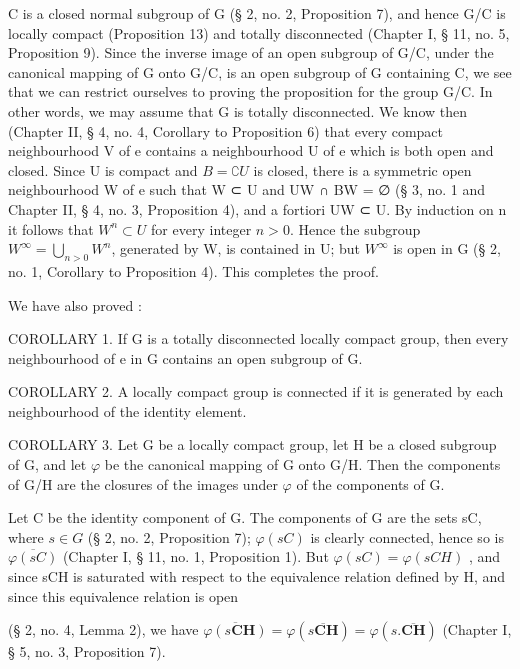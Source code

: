 C is a closed normal subgroup of G (§ 2, no. 2, Proposition 7), and hence G/C is locally compact (Proposition 13) and totally disconnected (Chapter I, § 11, no. 5, Proposition 9). Since the inverse image of an open subgroup of G/C, under the canonical mapping of G onto G/C, is an open subgroup of G containing C, we see that we can restrict ourselves to proving the proposition for the group G/C. In other words, we may assume that G is totally disconnected. We know then (Chapter II, § 4, no. 4, Corollary to Proposition 6) that every compact neighbourhood V of e contains a neighbourhood U of e which is both open and closed. Since U is compact and \(B = \complement U\) is closed, there is a symmetric open neighbourhood W of e such that W ⊂ U and UW ∩ BW = ∅ (§ 3, no. 1 and Chapter II, § 4, no. 3, Proposition 4), and a fortiori UW ⊂ U. By induction on n it follows that \(W^n \subset U\) for every integer \(n > 0\). Hence the subgroup \(W^\infty = \bigcup_{n > 0} W^n\), generated by W, is contained in U; but \(W^\infty\) is open in G (§ 2, no. 1, Corollary to Proposition 4). This completes the proof.

We have also proved :

COROLLARY 1. If G is a totally disconnected locally compact group, then every neighbourhood of e in G contains an open subgroup of G.

COROLLARY 2. A locally compact group is connected if it is generated by each neighbourhood of the identity element.

COROLLARY 3. Let G be a locally compact group, let H be a closed subgroup of G, and let \(\varphi\) be the canonical mapping of G onto G/H. Then the components of G/H are the closures of the images under \(\varphi\) of the components of G.

Let C be the identity component of G. The components of G are the sets sC, where \(s \in G\) (§ 2, no. 2, Proposition 7); \(\varphi(sC)\) is clearly connected, hence so is \(\overline{\varphi(sC)}\) (Chapter I, § 11, no. 1, Proposition 1). But \(\varphi(sC) = \varphi(sCH)\) , and since sCH is saturated with respect to the equivalence relation defined by H, and since this equivalence relation is open

(§ 2, no. 4, Lemma 2), we have \(\overline{\varphi(s\mathbf{CH})} = \varphi(\overline{s\mathbf{CH}}) = \varphi(s.\overline{\mathbf{CH}})\) (Chapter I, § 5, no. 3, Proposition 7).

